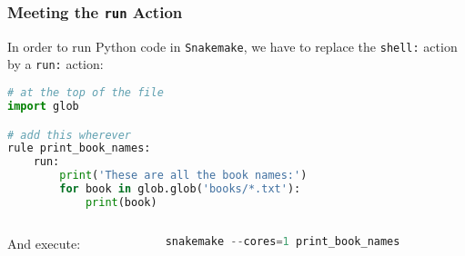 \begin{frame}[fragile]
  \frametitle{Meeting the \texttt{run} Action}
  \vspace{-0.5em}
  In order to run Python code in \texttt{Snakemake}, we have to replace the \texttt{shell:} action by a \texttt{run:} action:\vspace{-0.5em}
  \vspace{-0.5em}
  \begin{lstlisting}[language=Python,style=Python]
# at the top of the file
import glob

# add this wherever
rule print_book_names:
    run:
        print('These are all the book names:')
        for book in glob.glob('books/*.txt'):
            print(book)

  \end{lstlisting}\vspace{-0.5em}
  \begin{columns}
   \begin{column}{0.2\textwidth}
    And execute:
   \end{column}
   \begin{column}{0.8\textwidth}
\begin{lstlisting}[language=Python,style=Python]
snakemake --cores=1 print_book_names
  \end{lstlisting}
   \end{column}
  \end{columns}

\end{frame}

